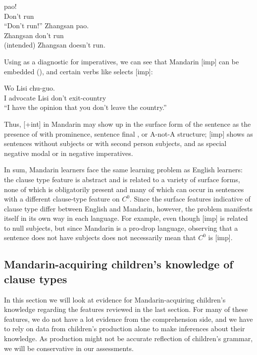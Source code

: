 \gll {} pao!\\
Don't run\\
``Don't run!''
\ex 
\gll *Zhangsan  pao.\\
Zhangsan don't run\\
(intended) Zhangsan doesn't run.
\exl
\eex 

Using  as a diagnostic for imperatives, we can see that Mandarin [imp] can be embedded (\cite{lithompson, chen2005imp}), and certain verbs like  selects [imp]:

\gll Wo  Lisi  chu-guo.\\
I advocate Lisi don't exit-country\\
\trans ``I have the opinion that you don't leave the country.'' \hfill \textcite[p.458]{lithompson}
\eex

Thus, [+int] in Mandarin may show up in the surface form of the sentence as the presence of \twh{} with prominence, sentence final , or A-not-A structure; [imp] shows as sentences without subjects or with second person subjects, and as special negative modal  or  in negative imperatives. 

In sum, Mandarin learners face the same learning problem as English learners: the clause type feature is abstract and is related to a variety of surface forms, none of which is obligatorily present and many of which can occur in sentences with a different clause-type feature on $C^{0}$. Since the surface features indicative of clause type differ between English and Mandarin, however, the problem manifests itself in its own way in each language. For example, even though [imp] is related to null subjects, but since Mandarin is a pro-drop language, observing that a sentence does not have subjects does not necessarily mean that $C^{0}$ is [imp].  


\subsection{Mandarin-acquiring children's knowledge of clause types}
\label{sec:mancl:bg:child}
In this section we will look at evidence for Mandarin-acquiring children's knowledge regarding the features reviewed in the last section. For many of these features, we do not have a lot evidence from the comprehension side, and we have to rely on data from children's production alone to make inferences about their knowledge. As production might not be accurate reflection of children's grammar, we will be conservative in our assessments.   

